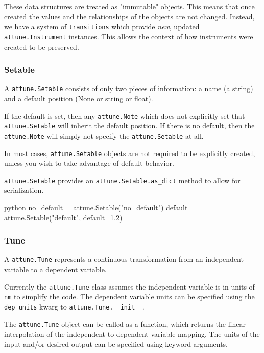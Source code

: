 These data structures are treated as "immutable" objects. This means
that once created the values and the relationships of the objects are
not changed. Instead, we have a system of \texttt{transitions} which
provide \emph{new}, updated \texttt{attune.Instrument}
instances. This allows the context of how instruments were created to be
preserved.

\hypertarget{setable}{%
\subsubsection{Setable}\label{setable}}

A \texttt{attune.Setable} consists of only two pieces
of information: a name (a string) and a default position (None or string
or float).

If the default is set, then any \texttt{attune.Note}
which does not explicitly set that
\texttt{attune.Setable} will inherit the default
position. If there is no default, then the
\texttt{attune.Note} will simply not specify the
\texttt{attune.Setable} at all.

In most cases, \texttt{attune.Setable} objects are not
required to be explicitly created, unless you wish to take advantage of
default behavior.

\texttt{attune.Setable} provides an
\texttt{attune.Setable.as\_dict} method to allow for
serialization.

\begin{codefragment}{python}
no_default = attune.Setable("no_default")
default = attune.Setable("default", default=1.2)
\end{codefragment}

\hypertarget{tune}{%
\subsubsection{Tune}\label{tune}}

A \texttt{attune.Tune} represents a continuous
transformation from an independent variable to a dependent variable.

Currently the \texttt{attune.Tune} class assumes the
independent variable is in units of \texttt{nm} to simplify the code.
The dependent variable units can be specified using the
\texttt{dep\_units} kwarg to
\texttt{attune.Tune.\_\_init\_\_}.

The \texttt{attune.Tune} object can be called as a
function, which returns the linear interpolation of the independent to
dependent variable mapping. The units of the input and/or desired output
can be specified using keyword arguments.

